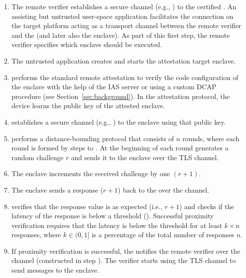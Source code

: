 \begin{enumerate}%
 
  \item[\one] The remote verifier establishes a secure channel (e.g., \tls) to the certified \device. An assisting but untrusted user-space application facilitates the connection on the target platform acting as a transport channel between the remote verifier and the \device (and later also the enclave). As part of this first step, the remote verifier specifies which enclave should be executed.%

  \item[\two] The untrusted application creates and starts the attestation target enclave.%

  \item[\three] \device performs the standard remote attestation to verify the code configuration of the enclave with the help of the IAS server or using a custom DCAP procedure (see Section~\ref{sec:background}). In the attestation protocol, the device learns the public key of the attested enclave.%

  \item[\four] \device establishes a secure channel (e.g., \tls) to the enclave using that public key.

  \item[\five] \device performs a distance-bounding protocol that consists of $n$ rounds, where each round is formed by steps \five to \eight.
  At the beginning of each round \device generates a random challenge $r$ and sends it to the enclave over the TLS channel.

  \item[\six] The enclave increments the received challenge by one $(r+1)$.

  \item[\seven] The enclave sends a response ($r+1$) back to the \device over the \tls channel.

  \item[\eight] \device verifies that the response value is as expected (i.e., $r+1$) and checks if the latency of the response is below a threshold (\connect). Successful proximity verification requires that the latency is below the threshold for at least $k \times n$ responses, where $k \in (0, 1]$ is a percentage of the total number of responses $n$.

  \item[\nine] If proximity verification is successful, the \device notifies the remote verifier over the \tls channel (constructed in step \one). The verifier starts using the \device TLS channel to send messages to the enclave.
\end{enumerate}


